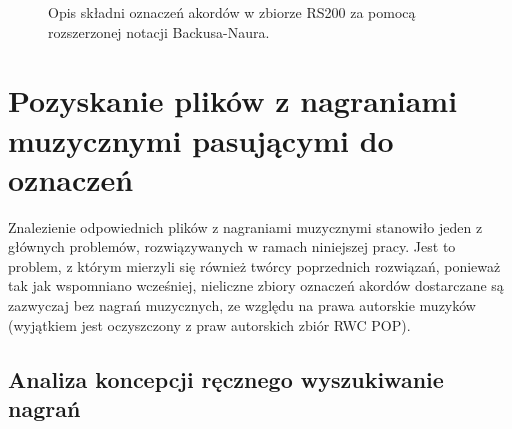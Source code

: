 \begin{figure}
    \centering
    {\scriptsize }
    \caption{Opis składni oznaczeń akordów w zbiorze RS200 za pomocą rozszerzonej notacji Backusa-Naura.}
    \label{fig:rs200_dt_syntax}
\end{figure}


\section{Pozyskanie plików z nagraniami muzycznymi pasującymi do oznaczeń}

Znalezienie odpowiednich plików z nagraniami muzycznymi stanowiło jeden z głównych problemów, rozwiązywanych w ramach niniejszej pracy. Jest to problem, z którym mierzyli się również twórcy poprzednich rozwiązań, ponieważ tak jak wspomniano wcześniej, nieliczne zbiory oznaczeń akordów dostarczane są zazwyczaj bez nagrań muzycznych, ze względu na prawa autorskie muzyków (wyjątkiem jest oczyszczony z praw autorskich zbiór RWC POP).

\subsection{Analiza koncepcji ręcznego wyszukiwanie nagrań}

